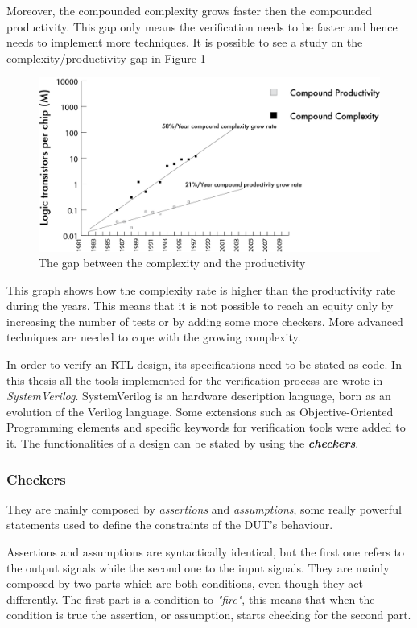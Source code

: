 Moreover, the compounded complexity grows faster then the compounded productivity. This gap only means the verification needs to be faster and hence needs to implement more techniques.
It is possible to see a study on the complexity/productivity gap in Figure \ref{complexity-gap}
\begin{figure}[H]
    \centering
    \includegraphics[scale = 0.4]{Chapter_1/img/prod-compl.png}
    \caption{The gap between the complexity and the productivity \cite{verification-book-2018}}
    \label{complexity-gap}
\end{figure}

This graph shows how the complexity rate is higher than the productivity rate during the years. This means that it is not possible to reach an equity only by increasing the number of tests or by adding some more checkers. More advanced techniques are needed to cope with the growing complexity.

In order to verify an RTL design, its specifications need to be stated as code. In this thesis all the tools implemented for the verification process are wrote in \emph{SystemVerilog}. 
SystemVerilog is an hardware description language, born as an evolution of the Verilog language. Some extensions such as Objective-Oriented Programming elements and speciﬁc keywords for verification tools were added to it. The functionalities of a design can be stated by using the \textbf{\emph{checkers}}.

\subsubsection{Checkers}
They are mainly composed by \emph{assertions} and \emph{assumptions}, some really powerful statements used to deﬁne the constraints of the DUT’s behaviour.

Assertions and assumptions are syntactically identical, but the first one refers to the output signals while the second one to the input signals.
They are mainly composed by two parts which are both conditions, even though they act differently. The first part is a condition to \textit{"fire"}, this means that when the condition is true the assertion, or assumption, starts checking for the second part.\cite{verification-book-2016}

